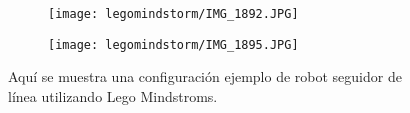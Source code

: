 \begin{figure}[H]
  \begin{subfigure}{.5\textwidth}
    \texttt{[image: legomindstorm/IMG\_1892.JPG]}
  \end{subfigure}
  \begin{subfigure}{.5\textwidth}
    \texttt{[image: legomindstorm/IMG\_1895.JPG]}
  \end{subfigure}
  \caption{Aquí se muestra una configuración ejemplo de robot seguidor de línea utilizando Lego Mindstroms.}
  \label{fig:P10robot}
\end{figure}




